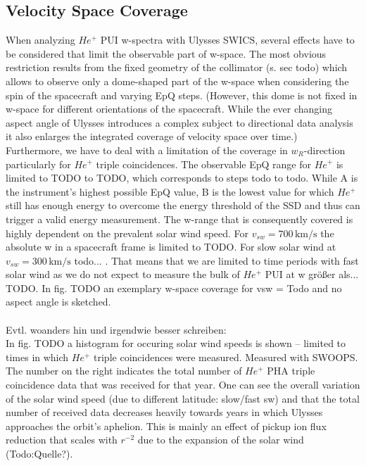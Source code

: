 \subsection{Velocity Space Coverage}
When analyzing $He^{+}$ PUI w-spectra with Ulysses SWICS, several effects have to be considered that limit the observable part of w-space. The most obvious restriction results from the fixed geometry of the collimator (s. sec todo) which allows to observe only a dome-shaped part of the w-space when considering the spin of the spacecraft and varying EpQ steps. (However, this dome is not fixed in w-space for different orientations of the spacecraft.
While the ever changing aspect angle of Ulysses introduces a complex subject to directional data analysis it also enlarges the integrated coverage of velocity space over time.)\\
Furthermore, we have to deal with a limitation of the coverage in $w_R$-direction particularly for $He^{+}$ triple coincidences. The observable EpQ range for $He^{+}$ is limited to TODO to TODO, which corresponds to steps todo to todo. While A is the instrument's highest possible EpQ value, B is the lowest value for which $He^{+}$ still has enough energy to overcome the energy threshold of the SSD and thus can trigger a valid energy measurement. 
The w-range that is consequently covered is highly dependent on the prevalent solar wind speed. For $v_{sw} = 700 \,\mathrm{km/s}$ the absolute w in a spacecraft frame is limited to TODO. For slow solar wind at $v_{sw} = 300 \,\mathrm{km/s}$ todo... . 
That means that we are limited to time periods with fast solar wind as we do not expect to measure the bulk of $He^{+}$ PUI at w größer als... TODO. In fig. TODO an exemplary w-space coverage for vsw = Todo and no aspect angle is sketched.
\\ \\
Evtl. woanders hin und irgendwie besser schreiben: \\
In fig. TODO a histogram for occuring solar wind speeds is shown -- limited to times in which $He^{+}$ triple coincidences were measured. Measured with SWOOPS. The number on the right indicates the total number of $He^{+}$ PHA triple coincidence data that was received for that year. One can see the overall variation of the solar wind speed (due to different latitude: slow/fast sw) and that the total number of received data decreases heavily towards years in which Ulysses approaches the orbit's aphelion. This is mainly an effect of pickup ion flux reduction that scales with $r^{-2}$ due to the expansion of the solar wind (Todo:Quelle?).

